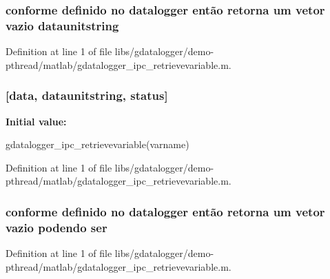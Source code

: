 \subsubsection[{dataunitstring}]{\setlength{\rightskip}{0pt plus 5cm}conforme definido no datalogger então retorna um vetor vazio {\bf dataunitstring}}\label{libs_2gdatalogger_2demo-pthread_2matlab_2gdatalogger__ipc__retrievevariable_8m_a0170ec389057b3cd5906e3a196aea560}


Definition at line 1 of file libs/gdatalogger/demo-\/pthread/matlab/gdatalogger\_\-ipc\_\-retrievevariable.m.
\subsubsection[{function}]{[{\bf data}, {\bf dataunitstring}, {\bf status}]}\label{libs_2gdatalogger_2demo-pthread_2matlab_2gdatalogger__ipc__retrievevariable_8m_ac132315a15f73d90d100c0d10aaa8c88}
{\bfseries Initial value:}
\begin{DoxyCode}
 gdatalogger_ipc_retrievevariable(varname)
%
% 
\end{DoxyCode}


Definition at line 1 of file libs/gdatalogger/demo-\/pthread/matlab/gdatalogger\_\-ipc\_\-retrievevariable.m.
\subsubsection[{ser}]{\setlength{\rightskip}{0pt plus 5cm}conforme definido no datalogger então retorna um vetor vazio podendo {\bf ser}}\label{libs_2gdatalogger_2demo-pthread_2matlab_2gdatalogger__ipc__retrievevariable_8m_a2865119cb33b58b219255e4beeaa5356}


Definition at line 1 of file libs/gdatalogger/demo-\/pthread/matlab/gdatalogger\_\-ipc\_\-retrievevariable.m.
